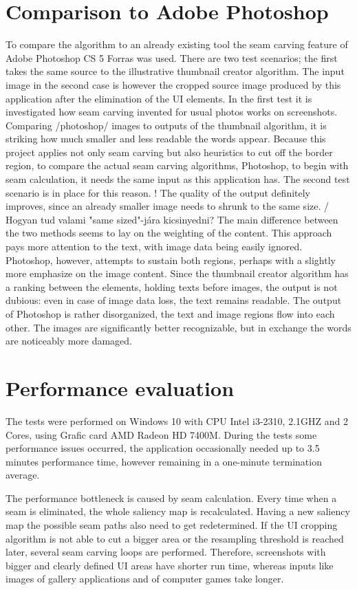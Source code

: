 \documentclass[draft,final]{vutinfth} %
\begin{document}
	\section{Comparison to Adobe Photoshop} 
	To compare the algorithm to an already existing tool the seam carving feature of Adobe Photoshop CS 5 Forras was used.
	There are two test scenarios; the first takes the same source to the illustrative thumbnail creator algorithm.
	The input image in the second case is however the cropped source image produced by this application after the elimination of the UI elements.
	In the first test it is investigated how seam carving invented for usual photos works on screenshots.
	Comparing  /photoshop/ images to outputs of the thumbnail algorithm, it is striking how much smaller and less readable the words appear.
	Because this project applies not only seam carving but also heuristics to cut off the border region, to compare the actual seam carving algorithms, Photoshop, to begin with seam calculation, it needs the same input as this application has.
	The second test scenario is in place for this reason.
	! The quality of the  output definitely improves, since an already smaller image needs to shrunk to the same size. / Hogyan  tud valami "same sized"-jára kicsinyedni?
	The main difference between the two methods seems to lay on the weighting of the content.
	This approach pays more attention to the text, with image data being easily ignored.
	Photoshop, however, attempts to sustain both regions, perhaps with a slightly more emphasize on the image content.
	Since the thumbnail creator algorithm has a ranking between the elements, holding texts before images, the output is not dubious: even in case of image data loss, the text remains readable.
	The output of Photoshop is rather disorganized, the text and image regions flow into each other.
	The images are significantly better recognizable, but in exchange the words are noticeably more damaged.  
	
	\section{Performance evaluation}
	The tests were performed on Windows 10 with CPU Intel i3-2310, 2.1GHZ and 2 Cores, using Grafic card AMD Radeon HD 7400M.
	During the tests some performance issues occurred, the application occasionally needed up to 3.5 minutes performance time, however remaining in a one-minute termination average.\par 
	The performance bottleneck is caused by seam calculation.
	Every time when a seam is eliminated, the whole saliency map is recalculated.
	Having a new saliency map the possible seam paths also need to get redetermined.
	If the UI cropping algorithm is not able to cut a bigger area or the resampling threshold is reached later, several seam carving loops are performed. 
	Therefore, screenshots with bigger and clearly defined UI areas have shorter run time, whereas inputs like images of gallery applications and of computer games take longer. 
	
\end{document}

